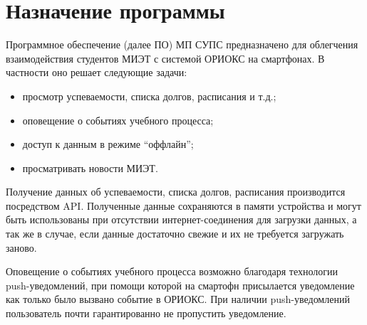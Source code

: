 \chapter{Назначение программы}
\label{ch:function}

Программное обеспечение (далее ПО) МП СУПС предназначено для облегчения взаимодействия студентов МИЭТ с системой ОРИОКС на смартфонах.
В частности оно решает следующие задачи:
\begin{itemize}
  \item просмотр успеваемости, списка долгов, расписания и т.д.;
  \item оповещение о событиях учебного процесса;
  \item доступ к данным в режиме ``оффлайн'';
  \item просматривать новости МИЭТ.
\end{itemize}

Получение данных об успеваемости, списка долгов, расписания производится посредством API\@.
Полученные данные сохраняются в памяти устройства и могут быть использованы при отсутствии интернет-соединения для загрузки данных, а так же в случае, если данные достаточно свежие и их не требуется загружать заново.

Оповещение о событиях учебного процесса возможно благодаря технологии push-уведомлений, при помощи которой на смартофн присылается уведомление как только было вызвано событие в ОРИОКС\@.
При наличии push-уведомлений пользователь почти гарантированно не пропустить уведомление.
